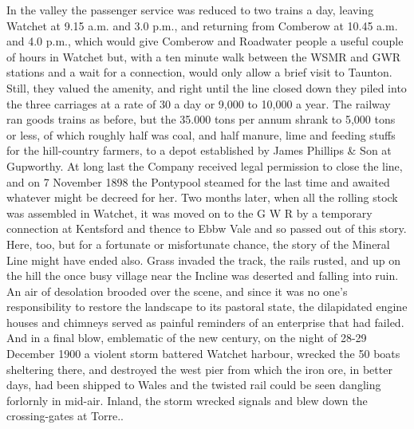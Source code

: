 \documentclass[10pt,a4paper]{article}
\begin{document}
    In the valley the passenger service was reduced to two trains a day, leaving Watchet at 9.15 a.m. and 3.0 p.m., and returning from Comberow at 10.45 a.m. and 4.0 p.m., which would give Comberow and Roadwater people a useful couple of hours in Watchet but, with a ten minute walk between the WSMR and GWR stations and a wait for a connection, would only allow  a brief visit to Taunton.  Still, they valued the amenity, and right until the line closed down they piled into the three carriages at a rate of 30 a day or 9,000 to 10,000 a year.
   The railway ran goods trains as before, but the 35.000 tons per annum shrank to 5,000 tons or less, of which roughly half was coal, and half manure, lime and feeding stuffs for the hill-country farmers, to a depot established by James Phillips \& Son at Gupworthy. 
   At long last the Company received legal permission to close the line, and on 7 November 1898 the Pontypool steamed for the last time and awaited whatever might be decreed for her. Two months later, when all the rolling stock was assembled in Watchet, it was moved on to the G W R by a temporary connection at Kentsford and thence to Ebbw Vale and so passed out of this story.
  Here, too, but for a fortunate or misfortunate chance, the story of the Mineral Line might have ended also. Grass invaded the track, the rails rusted, and up on the hill the once busy village near the Incline was deserted and falling into ruin.  An air of desolation brooded over the scene, and since it was no one’s responsibility to restore the landscape to its pastoral state, the dilapidated engine houses and chimneys served as painful reminders of an enterprise that had failed. And in a final blow, emblematic of the new century, on the night of 28-29 December 1900 a violent storm battered Watchet harbour, wrecked the 50 boats sheltering there, and destroyed the west pier from which the iron ore, in better days, had been shipped to Wales and  the twisted rail could be seen dangling forlornly in mid-air. Inland, the storm wrecked signals and blew down the crossing-gates at Torre..
\end{document}
